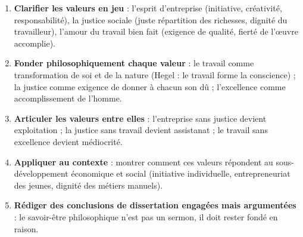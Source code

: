 \documentclass[11pt]{article}
\newcommand{\cle}[1]{{\popxbold\color{popdark}#1}}
\begin{document}
\begin{methode}
\begin{enumerate}
\item \textbf{Clarifier les valeurs en jeu} : l'\cle{esprit d'entreprise} (initiative, créativité, responsabilité), la \cle{justice sociale} (juste répartition des richesses, dignité du travailleur), l'\cle{amour du travail bien fait} (exigence de qualité, fierté de l'œuvre accomplie).
\item \textbf{Fonder philosophiquement chaque valeur} : le travail comme transformation de soi et de la nature (Hegel : le travail forme la conscience) ; la justice comme exigence de donner à chacun son dû ; l'excellence comme accomplissement de l'homme.
\item \textbf{Articuler les valeurs entre elles} : l'entreprise sans justice devient exploitation ; la justice sans travail devient assistanat ; le travail sans excellence devient médiocrité.
\item \textbf{Appliquer au contexte} : montrer comment ces valeurs répondent au sous-développement économique et social (initiative individuelle, entrepreneuriat des jeunes, dignité des métiers manuels).
\item \textbf{Rédiger des conclusions de dissertation engagées mais argumentées} : le savoir-être philosophique n'est pas un sermon, il doit rester fondé en raison.
\end{enumerate}
\end{methode}
\end{document}
